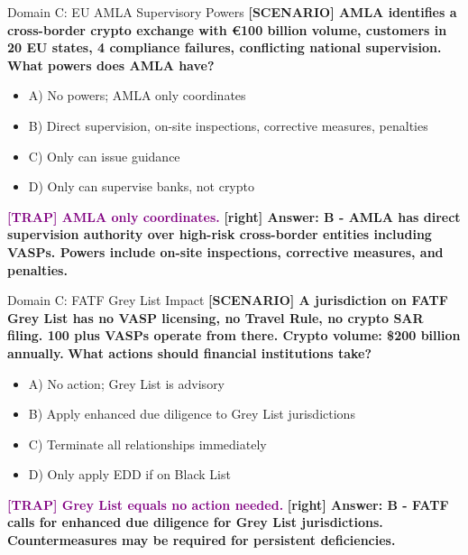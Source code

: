 \documentclass[11pt,a4paper]{beamer}
\newcommand{\trap}[1]{\textcolor{purple}{\textbf{[TRAP] #1}}}
\newcommand{\correct}[1]{\textcolor{green!50!black}{\textbf{[right] #1}}}
\newcommand{\scenario}[1]{\textcolor{blue!70!black}{\textbf{[SCENARIO] #1}}}
\begin{document}
\begin{frame}{Domain C: EU AMLA Supervisory Powers}
\scenario{AMLA identifies a cross-border crypto exchange with €100 billion volume, customers in 20 EU states, 4 compliance failures, conflicting national supervision.}
\vspace{0.2cm}
\textbf{What powers does AMLA have?}
\vspace{0.2cm}
\begin{itemize}
    \item A) No powers; AMLA only coordinates
    \item B) Direct supervision, on-site inspections, corrective measures, penalties
    \item C) Only can issue guidance
    \item D) Only can supervise banks, not crypto
\end{itemize}
\vspace{0.2cm}
\trap{AMLA only coordinates.}
\correct{Answer: B - AMLA has direct supervision authority over high-risk cross-border entities including VASPs. Powers include on-site inspections, corrective measures, and penalties.}
\end{frame}

\begin{frame}{Domain C: FATF Grey List Impact}
\scenario{A jurisdiction on FATF Grey List has no VASP licensing, no Travel Rule, no crypto SAR filing. 100 plus VASPs operate from there. Crypto volume: \$200 billion annually.}
\vspace{0.2cm}
\textbf{What actions should financial institutions take?}
\vspace{0.2cm}
\begin{itemize}
    \item A) No action; Grey List is advisory
    \item B) Apply enhanced due diligence to Grey List jurisdictions
    \item C) Terminate all relationships immediately
    \item D) Only apply EDD if on Black List
\end{itemize}
\vspace{0.2cm}
\trap{Grey List equals no action needed.}
\correct{Answer: B - FATF calls for enhanced due diligence for Grey List jurisdictions. Countermeasures may be required for persistent deficiencies.}
\end{frame}
\end{document}
